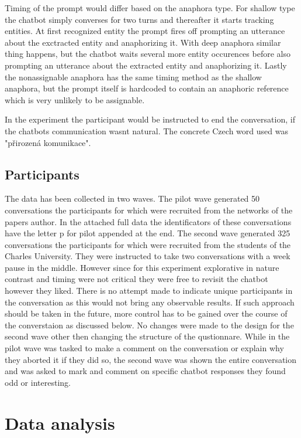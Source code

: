 \documentclass[12pt]{report}
\begin{document}
{Timing of the prompt would differ based on the anaphora type.
For shallow type the chatbot simply converses for two turns and thereafter it starts tracking entities.
At first recognized entity the prompt fires off
prompting an utterance about the exctracted entity and anaphorizing it.
With deep anaphora similar thing happens,
but the chatbot waits several more entity occurences
before also prompting an utterance about the extracted entity and anaphorizing it.
Lastly the nonassignable anaphora has the same timing method as the shallow anaphora,
but the prompt itself is hardcoded to contain an anaphoric reference which is
very unlikely to be assignable.

In the experiment the participant would be instructed to end the conversation,
if the chatbots communication wasnt natural.
The concrete Czech word used was "přirozená komunikace".

\subsection{Participants}
The data has been collected in two waves.
The pilot wave generated 50 conversations
the participants for which were recruited from the networks of the papers author.
In the attached full data
the identificators of these conversations have
the letter p for pilot appended at the end.
The second wave generated 325 conversations
the participants for which were recruited from the students of the Charles University.
They were instructed to take two conversations with a week pause in the middle.
However since for this experiment explorative in nature contrast and timing were not critical
they were free to revisit the chatbot however they liked.
There is no attempt made to indicate unique participants in the conversation as
this would not bring any observable results.
If such approach should be taken in the future,
more control has to be gained over the course of the converstaion
as discussed below.
No changes were made to the design for the second wave other then changing the structure of the qustionnare.
While in the pilot wave was tasked to make a comment on the conversation or
explain why they aborted it if they did so,
the second wave was shown the entire conversation
and was asked to mark and comment on specific chatbot responses they found odd or interesting.

\section{Data analysis}

}
\end{document}

